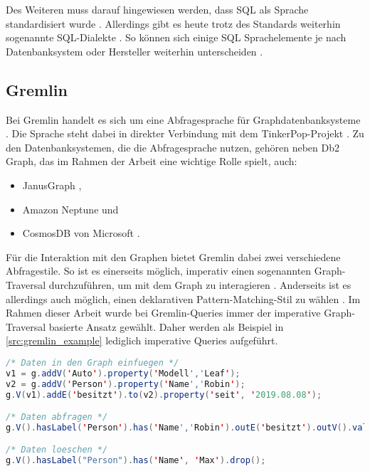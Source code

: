 Des Weiteren muss darauf hingewiesen werden, dass SQL als Sprache standardisiert wurde \cite{sql_history}. Allerdings gibt es heute trotz des Standards weiterhin sogenannte SQL-Dialekte \cite{sql_2017}. So können sich einige SQL Sprachelemente je nach Datenbanksystem oder Hersteller weiterhin unterscheiden \cite{sql_2017}. 

\subsection{Gremlin}

Bei Gremlin handelt es sich um eine Abfragesprache für  Graphdatenbanksysteme \cite{tinkerpop_2020}. Die Sprache steht dabei in direkter Verbindung mit dem TinkerPop-Projekt  \cite{tinkerpop_2020}. Zu den Datenbanksystemen, die die Abfragesprache nutzen, gehören neben Db2 Graph, das im Rahmen der Arbeit eine wichtige Rolle spielt, auch:
\begin{itemize}
    \item JanusGraph \cite{janusgraph_2020},
    \item Amazon Neptune \cite{neptune_2021} und 
    \item CosmosDB von Microsoft \cite{cosmosdb_2021}.
\end{itemize}

Für die Interaktion mit den Graphen bietet Gremlin dabei zwei verschiedene Abfragestile. So ist es einerseits möglich, imperativ einen sogenannten Graph-Traversal durchzuführen, um mit dem Graph zu interagieren \cite{gremlin_paper}. Anderseits ist es allerdings auch möglich, einen deklarativen Pattern-Matching-Stil zu wählen \cite{gremlin_paper}. Im Rahmen dieser Arbeit wurde bei Gremlin-Queries immer der imperative Graph-Traversal basierte Ansatz gewählt. Daher werden als Beispiel in \autoref{src:gremlin_example} lediglich imperative Queries aufgeführt. 

\begin{lstlisting}[caption={Beispiel Gremlin-Queries},language=JAVA,label=src:gremlin_example]
/* Daten in den Graph einfuegen */
v1 = g.addV('Auto').property('Modell','Leaf');
v2 = g.addV('Person').property('Name','Robin');
g.V(v1).addE('besitzt').to(v2).property('seit', '2019.08.08');

/* Daten abfragen */
g.V().hasLabel('Person').has('Name','Robin').outE('besitzt').outV().values('Modell')

/* Daten loeschen */
g.V().hasLabel("Person").has('Name', 'Max').drop();
\end{lstlisting}

